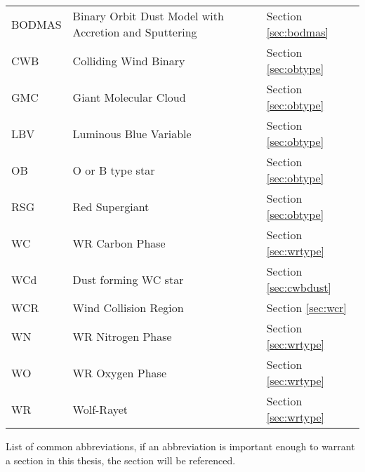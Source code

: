\begin{abbreviations}

\begin{table}[h]
  \centering
  \begin{tabular}{l|l|l}
    
    \hline

    BODMAS & Binary Orbit Dust Model with Accretion and Sputtering & Section \ref{sec:bodmas} \\
    CWB & Colliding Wind Binary  & Section \ref{sec:obtype} \\
    GMC & Giant Molecular Cloud & Section \ref{sec:obtype}\\
    LBV & Luminous Blue Variable & Section \ref{sec:obtype} \\
    OB  & O or B type star & Section \ref{sec:obtype} \\ 
    RSG & Red Supergiant & Section \ref{sec:obtype} \\
    WC  & WR Carbon Phase & Section \ref{sec:wrtype} \\
    WCd & Dust forming WC star & Section \ref{sec:cwbdust} \\
    WCR & Wind Collision Region & Section \ref{sec:wcr} \\
    WN  & WR Nitrogen Phase & Section \ref{sec:wrtype} \\
    WO  & WR Oxygen Phase & Section \ref{sec:wrtype} \\
    WR  & Wolf-Rayet & Section \ref{sec:wrtype} \\

    \hline

  \end{tabular} 
  \label{tbl:Abbreviations}
  \end{table}

List of common abbreviations, if an abbreviation is important enough to warrant a section in this thesis, the section will be referenced.

\end{abbreviations}
